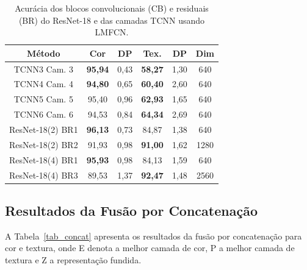 \documentclass[conference]{IEEEtran}
\begin{document}
\begin{table}[htbp]
\caption{Acur\'{a}cia dos blocos convolucionais (CB) e residuais (BR) do
         ResNet-18 e das camadas TCNN usando LMFCN.}
\begin{center}
\begin{tabular}{c|c|c|c|c|c}
\hline
\textbf{M\'{e}todo} & \textbf{Cor} & \textbf{DP}
                    & \textbf{Tex.} & \textbf{DP} & \textbf{Dim} \\
\hline
TCNN3 Cam. 3      & \textbf{95,94} & 0,43 & \textbf{58,27} & 1,30 & 640  \\
TCNN4 Cam. 4      & \textbf{94,80} & 0,65 & \textbf{60,40} & 2,60 & 640  \\
TCNN5 Cam. 5      & 95,40 & 0,96 & \textbf{62,93} & 1,65 & 640  \\
TCNN6 Cam. 6      & 94,53 & 0,84 & \textbf{64,34} & 2,69 & 640  \\
ResNet-18(2) BR1  & \textbf{96,13} & 0,73 & 84,87 & 1,38 & 640  \\
ResNet-18(2) BR2  & 91,93 & 0,98 & \textbf{91,00} & 1,62 & 1280 \\
ResNet-18(4) BR1  & \textbf{95,93} & 0,98 & 84,13 & 1,59 & 640  \\
ResNet-18(4) BR3  & 89,53 & 1,37 & \textbf{92,47} & 1,48 & 2560 \\
\hline
\end{tabular}
\label{tab1}
\end{center}
\end{table}

\subsection{Resultados da Fus\~{a}o por Concatena\c{c}\~{a}o}

A Tabela~\ref{tab_concat} apresenta os resultados da fus\~{a}o por
concatena\c{c}\~{a}o para cor e textura, onde E denota a melhor camada
de cor, P a melhor camada de textura e Z a representa\c{c}\~{a}o fundida.
\end{document}
